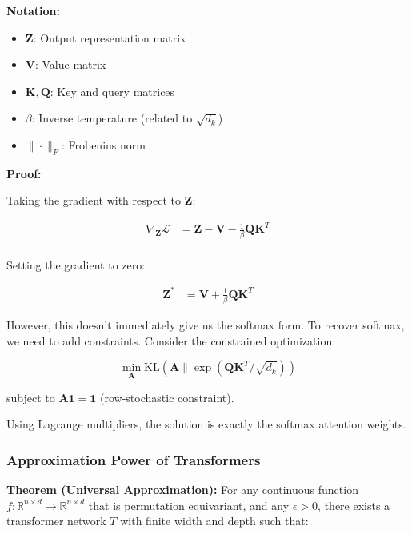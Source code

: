 \documentclass[11pt]{article}
\begin{document}
\begin{notationbox}
\textbf{Notation:}
\begin{itemize}
    \item $\mathbf{Z}$: Output representation matrix
    \item $\mathbf{V}$: Value matrix
    \item $\mathbf{K}, \mathbf{Q}$: Key and query matrices
    \item $\beta$: Inverse temperature (related to $\sqrt{d_k}$)
    \item $\|\cdot\|_F$: Frobenius norm
\end{itemize}
\end{notationbox}

\textbf{Proof:}

Taking the gradient with respect to $\mathbf{Z}$:

\begin{align}
\nabla_{\mathbf{Z}} \mathcal{L} &= \mathbf{Z} - \mathbf{V} - \frac{1}{\beta} \mathbf{Q} \mathbf{K}^T \\
\end{align}

Setting the gradient to zero:

\begin{align}
\mathbf{Z}^* &= \mathbf{V} + \frac{1}{\beta} \mathbf{Q} \mathbf{K}^T
\end{align}

However, this doesn't immediately give us the softmax form. To recover softmax, we need to add constraints. Consider the constrained optimization:

\begin{equation}
\min_{\mathbf{A}} \text{KL}(\mathbf{A} \| \exp(\mathbf{Q}\mathbf{K}^T / \sqrt{d_k}))
\end{equation}

subject to $\mathbf{A} \mathbf{1} = \mathbf{1}$ (row-stochastic constraint).

Using Lagrange multipliers, the solution is exactly the softmax attention weights.

\subsubsection{Approximation Power of Transformers}

\textbf{Theorem (Universal Approximation):} For any continuous function $f: \mathbb{R}^{n \times d} \rightarrow \mathbb{R}^{n \times d}$ that is permutation equivariant, and any $\epsilon > 0$, there exists a transformer network $T$ with finite width and depth such that:
\end{document}
